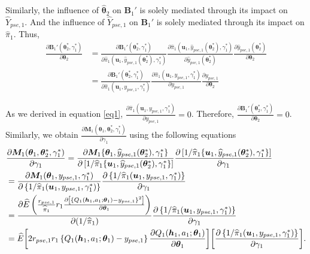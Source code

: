 \documentclass[12pt]{article}
\begin{document}
Similarly, the influence of $\widehat{\bm{\theta}}_2$ on $\bm{B}_1'$ is solely mediated through its impact on $\widehat{Y}_{pse,1}$. And the influence of $\widehat{Y}_{pse,1}$ on $\bm{B}_1'$ is solely mediated through its impact on $\widehat{\pi}_{1}$. Thus, 
\begin{align*}
    \frac{\partial \bm{B}_1'(\bm{\theta}_2^*, \gamma_1^*)}{\partial \bm{\theta}_2} &= \frac{\partial \bm{B}_1'(\bm{\theta}_2^*, \gamma_1^*)}{\partial \widehat{\pi}_1(\bm{u}_1,\widehat{y}_{pse,1}(\bm{\theta}_2^*),\gamma_1^*)} \frac{\partial\widehat{\pi}_1(\bm{u}_1,\widehat{y}_{pse,1}(\bm{\theta}_2^*),\gamma_1^*)}{\partial \widehat{y}_{pse,1}(\bm{\theta}_2^*)}  \frac{\partial \widehat{y}_{pse,1}(\bm{\theta}_2^*)}{\partial\bm{\theta}_2}\\
    &=\frac{\partial \bm{B}_1'(\bm{\theta}_2^*, \gamma_1^*)}{\partial \widehat{\pi}_1(\bm{u}_1,y_{pse,1},\gamma_1^*)} \frac{\partial\widehat{\pi}_1(\bm{u}_1,y_{pse,1},\gamma_1^*)}{\partial y_{pse,1}}  \frac{\partial y_{pse,1}}{\partial\bm{\theta}_2} \label{eq1}
\end{align*} 

As we derived in equation \eqref{eq1}, $\frac{\partial\widehat{\pi}_1(\bm{u}_1,y_{pse,1},\gamma_1^*)}{\partial y_{pse,1}} = 0$. Therefore, $\frac{\partial \bm{B}_1'(\bm{\theta}_2^*, \gamma_1^*)}{\partial \bm{\theta}_2} = 0$.
\fi
Similarly, we obtain $\frac{\partial \bm{M}_1(\bm{\theta}_1, \bm{\theta}_2^*,\gamma_1^*)}{\partial \gamma_1}$ using the following equations
\begin{align}
    &\frac{\partial \bm{M}_1(\bm{\theta}_1, \bm{\theta}_2^*,\gamma_1^*)}{\partial \gamma_1}  = \frac{\partial \bm{M}_1\{\bm{\theta}_1, \widehat{y}_{pse,1}(\bm{\theta}_2^*),\gamma_1^*\}}{\partial \left[1/\widehat{\pi}_1\{\bm{u}_1,\widehat{y}_{pse,1}(\bm{\theta}_2^*),\gamma_1^*\}\right]} \frac{\partial \left[1/\widehat{\pi}_1\{\bm{u}_1,\widehat{y}_{pse,1}(\bm{\theta}_2^*),\gamma_1^*\}\right]}{\partial \gamma_1} \notag \\
    &=  \frac{\partial \bm{M}_1(\bm{\theta}_1, y_{pse,1},\gamma_1^*)}{\partial \left\{1/\widehat{\pi}_1(\bm{u}_1,y_{pse,1},\gamma_1^*)\right\}} \frac{\partial \left\{1/\widehat{\pi}_1(\bm{u}_1,y_{pse,1},\gamma_1^*)\right\}}{\partial \gamma_1} \notag \\
    &= \frac{\partial \widehat{E} \left(\frac{r_{pse,1}}{\widehat{\pi}_{1}}r_{1} \frac{\partial \left[ \left\{ Q_1(\bm{h}_1,a_1;\bm{\theta}_1) - y_{pse,1}  \right\}^2\right]}{\partial \bm{\theta}_1} \right)}{\partial (1/\widehat{\pi}_1)} \frac{\partial \left\{1/\widehat{\pi}_1(\bm{u}_1,y_{pse,1},\gamma_1^*)\right\}}{\partial \gamma_1} \notag \\
    &= \widehat{E} \bigg[2r_{pse,1}r_{1}\left\{ Q_1(\bm{h}_1,a_1;\bm{\theta}_1) - y_{pse,1}\right\} \frac{\partial  Q_1(\bm{h}_1,a_1;\bm{\theta}_1) }{\partial \bm{\theta}_1} \bigg] \bigg[ \frac{\partial \left\{1/\widehat{\pi}_1(\bm{u}_1,y_{pse,1},\gamma_1^*)\right\}}{\partial \gamma_1}\bigg]. \label{eq2}
\end{align}
\end{document}
